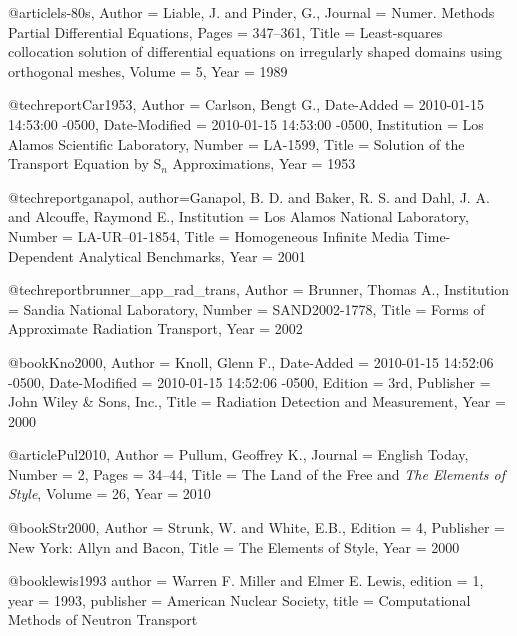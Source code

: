 @article{ls-80s,
	Author = { Liable, J. and Pinder, G.},
	Journal = {Numer. Methods Partial Differential Equations},
	Pages = {347--361},
	Title = {Least-squares collocation solution of differential equations on irregularly shaped domains using orthogonal meshes},
	Volume = {5},
	Year = {1989}}

@techreport{Car1953,
	Author = {Carlson, Bengt G.},
	Date-Added = {2010-01-15 14:53:00 -0500},
	Date-Modified = {2010-01-15 14:53:00 -0500},
	Institution = {Los Alamos Scientific Laboratory},
	Number = {LA-1599},
	Title = {Solution of the Transport Equation by {S$_n$} Approximations},
	Year = {1953}}

@techreport{ganapol,
	author={Ganapol, B. D. and Baker, R. S.  and Dahl, J. A. and Alcouffe, Raymond E.},
	Institution = {Los Alamos National Laboratory},
	Number = {LA-UR--01-1854},
	Title = {Homogeneous Infinite Media Time-Dependent Analytical Benchmarks},
	Year = {2001}}

@techreport{brunner_app_rad_trans,
	Author = {Brunner, Thomas A.},
	Institution = {Sandia National Laboratory},
	Number = {SAND2002-1778},
	Title = {{Forms of Approximate Radiation Transport}},
	Year = {2002}}

@book{Kno2000,
	Author = {Knoll, Glenn F.},
	Date-Added = {2010-01-15 14:52:06 -0500},
	Date-Modified = {2010-01-15 14:52:06 -0500},
	Edition = {3rd},
	Publisher = {John Wiley \& Sons, Inc.},
	Title = {Radiation Detection and Measurement},
	Year = {2000}}

@article{Pul2010,
	Author = {Pullum, Geoffrey K.},
	Journal = {English Today},
	Number = {2},
	Pages = {34--44},
	Title = {The Land of the Free and \emph{The Elements of Style}},
	Volume = {26},
	Year = {2010}}

@book{Str2000,
	Author = {Strunk, W. and White, E.B.},
	Edition = {4},
	Publisher = {New York: Allyn and Bacon},
	Title = {The Elements of Style},
	Year = {2000}}

@book{lewis1993
    author = {Warren F. Miller and Elmer E. Lewis},
    edition = {1},
    year = {1993},
    publisher = {{American Nuclear Society}},
    title = {{Computational Methods of Neutron Transport}}
}

